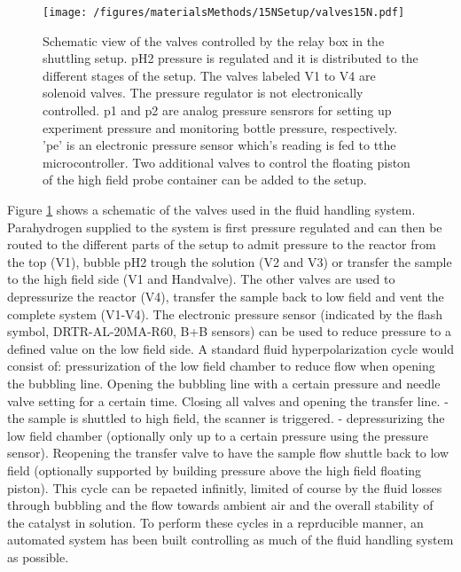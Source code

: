             \begin{figure}
                \texttt{[image: /figures/materialsMethods/15NSetup/valves15N.pdf]}
                \caption[Valve assembly shuttling system]{Schematic view of the valves controlled by the relay box in the shuttling setup. pH2 pressure is regulated and it is distributed to the different stages of the setup. The valves labeled V1 to V4 are solenoid valves. The pressure regulator is not electronically controlled. p1 and p2 are analog pressure sensrors for setting up experiment pressure and monitoring bottle pressure, respectively. 'pe' is an electronic pressure sensor which's reading is fed to tthe microcontroller. Two additional valves to control the floating piston of the high field probe container can be added to the setup.}
                \label{fig:materialsMethods:valveSetup}
            \end{figure}
            Figure \ref{fig:materialsMethods:valveSetup} shows a schematic of the valves used in the fluid handling system. Parahydrogen supplied to the system is first pressure regulated and can then be routed to the different parts of the setup to admit pressure to the reactor from the top (V1), bubble pH2 trough the solution (V2 and V3) or transfer the sample to the high field side (V1 and Handvalve). The other valves are used to depressurize the reactor (V4), transfer the sample back to low field and vent the complete system (V1-V4). The electronic pressure sensor (indicated by the flash symbol, DRTR-AL-20MA-R60, B+B sensors) can be used to reduce pressure to a defined value on the low field side.
            A standard fluid hyperpolarization cycle would consist of: pressurization of the low field chamber to reduce flow when opening the bubbling line.  Opening the bubbling line with a certain pressure and needle valve setting for a certain time.  Closing all valves and opening the transfer line. - the sample is shuttled to high field, the scanner is triggered. - depressurizing the low field chamber (optionally only up to a certain pressure using the pressure sensor).  Reopening the transfer valve to have the sample flow shuttle back to low field (optionally supported by building pressure above the high field floating piston).
            This cycle can be repaeted infinitly, limited of course by the fluid losses through bubbling and the flow towards ambient air and the overall stability of the catalyst in solution. 
            To perform these cycles in a reprducible manner, an automated system has been built controlling as much of the fluid handling system as possible.

